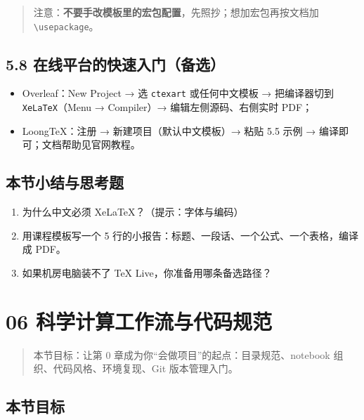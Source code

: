 \begin{quote}
注意：\textbf{不要手改模板里的宏包配置}，先照抄；想加宏包再按文档加
\texttt{\textbackslash{}usepackage}。
\end{quote}

\subsection{5.8
在线平台的快速入门（备选）}\label{ux5728ux7ebfux5e73ux53f0ux7684ux5febux901fux5165ux95e8ux5907ux9009}

\begin{itemize}
\tightlist
\item
  Overleaf：New Project → 选 \texttt{ctexart} 或任何中文模板 →
  把编译器切到 \texttt{XeLaTeX}（Menu → Compiler）→
  编辑左侧源码、右侧实时 PDF；
\item
  LoongTeX：注册 → 新建项目（默认中文模板）→ 粘贴 5.5 示例 →
  编译即可；文档帮助见官网教程。
\end{itemize}

\subsection{本节小结与思考题}\label{ux672cux8282ux5c0fux7ed3ux4e0eux601dux8003ux9898-3}

\begin{enumerate}
\def\labelenumi{\arabic{enumi}.}
\tightlist
\item
  为什么中文必须 XeLaTeX？（提示：字体与编码）
\item
  用课程模板写一个 5
  行的小报告：标题、一段话、一个公式、一个表格，编译成 PDF。
\item
  如果机房电脑装不了 TeX Live，你准备用哪条备选路径？
\end{enumerate}

\section{06
科学计算工作流与代码规范}\label{ux79d1ux5b66ux8ba1ux7b97ux5de5ux4f5cux6d41ux4e0eux4ee3ux7801ux89c4ux8303}

\begin{quote}
本节目标：让第 0 章成为你``会做项目''的起点：目录规范、notebook
组织、代码风格、环境复现、Git 版本管理入门。
\end{quote}

\subsection{本节目标}\label{ux672cux8282ux76eeux6807-5}

